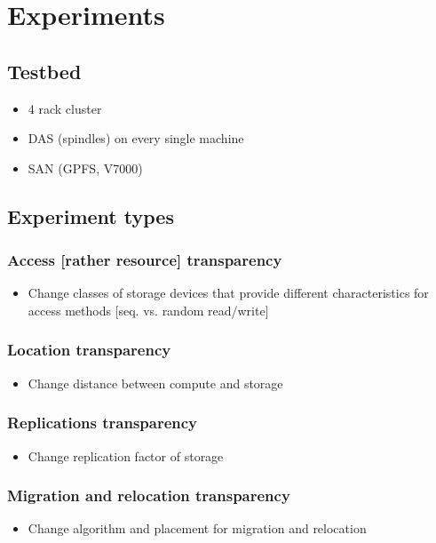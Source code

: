 \section{Experiments}

\subsection{Testbed}
\begin{itemize}
\item 4 rack cluster
\item DAS (spindles) on every single machine
\item SAN (GPFS, V7000)
\end{itemize}

\subsection{Experiment types}
\subsubsection{Access [rather resource] transparency}
\begin{itemize}
\item Change classes of storage devices that provide different characteristics for access methods [seq. vs. random read/write]
\end{itemize}

\subsubsection{Location transparency}
\begin{itemize}
\item Change distance between compute and storage
\end{itemize}

\subsubsection{Replications transparency}
\begin{itemize}
\item Change replication factor of storage
\end{itemize}

\subsubsection{Migration and relocation transparency}
\begin{itemize}
\item Change algorithm and placement for migration and relocation
\end{itemize}

